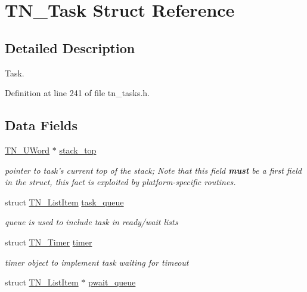 \hypertarget{structTN__Task}{\section{T\+N\+\_\+\+Task Struct Reference}
\label{structTN__Task}
}


\subsection{Detailed Description}
Task. 

Definition at line 241 of file tn\+\_\+tasks.\+h.

\subsection*{Data Fields}
\begin{DoxyCompactItemize}
\item 
\hyperlink{tn__arch__example_8h_ab80cba0fe9ffcd9011d53dfeb9e39bf4}{T\+N\+\_\+\+U\+Word} $\ast$ \hyperlink{structTN__Task_a6e31948663b2846ac9dddc05f529286a}{stack\+\_\+top}
\begin{DoxyCompactList}\small\item\em pointer to task's current top of the stack; Note that this field {\bfseries must} be a first field in the struct, this fact is exploited by platform-\/specific routines. \end{DoxyCompactList}\item 
\hypertarget{structTN__Task_a0772dfcd1f95d0ba10b9d2820fb9201b}{struct \hyperlink{structTN__ListItem}{T\+N\+\_\+\+List\+Item} \hyperlink{structTN__Task_a0772dfcd1f95d0ba10b9d2820fb9201b}{task\+\_\+queue}}\label{structTN__Task_a0772dfcd1f95d0ba10b9d2820fb9201b}

\begin{DoxyCompactList}\small\item\em queue is used to include task in ready/wait lists \end{DoxyCompactList}\item 
\hypertarget{structTN__Task_ac394d7ba177bab077969e9d96cddd8fb}{struct \hyperlink{structTN__Timer}{T\+N\+\_\+\+Timer} \hyperlink{structTN__Task_ac394d7ba177bab077969e9d96cddd8fb}{timer}}\label{structTN__Task_ac394d7ba177bab077969e9d96cddd8fb}

\begin{DoxyCompactList}\small\item\em timer object to implement task waiting for timeout \end{DoxyCompactList}\item 
\hypertarget{structTN__Task_a971ab5689af53bed2548c62f3bcabdc5}{struct \hyperlink{structTN__ListItem}{T\+N\+\_\+\+List\+Item} $\ast$ \hyperlink{structTN__Task_a971ab5689af53bed2548c62f3bcabdc5}{pwait\+\_\+queue}}\label{structTN__Task_a971ab5689af53bed2548c62f3bcabdc5}


\end{DoxyCompactItemize}
